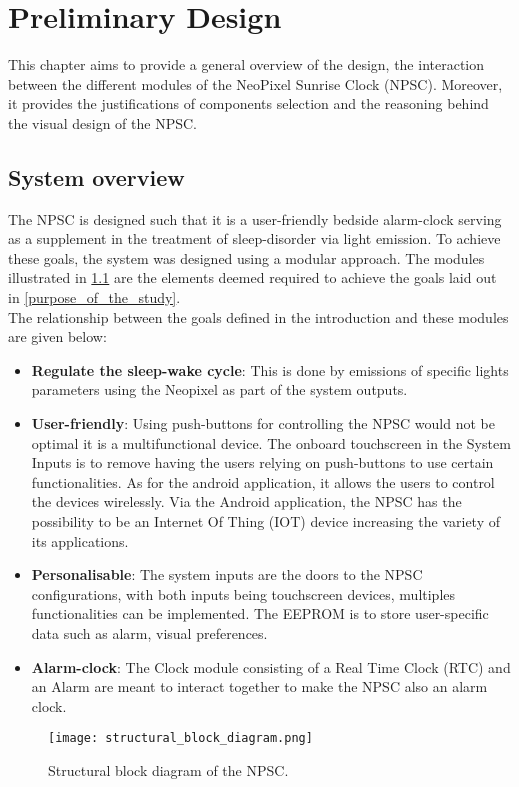 \chapter{Preliminary Design}

This chapter aims to provide a general overview of the design, the interaction between the different modules of the NeoPixel Sunrise Clock (NPSC). Moreover, it provides the justifications of components selection and the reasoning behind the visual design of the NPSC.

\section{System overview}\label{system_overview}
The NPSC is designed such that it is a user-friendly bedside alarm-clock serving as a supplement in the treatment of sleep-disorder via light emission. To achieve these goals, the system was designed using a modular approach. The modules illustrated in  \cref{fig:strutural_block_diagram} are the elements deemed required to achieve the goals laid out in \ref{purpose_of_the_study}. \\
The relationship between the goals defined in the introduction and these modules are given below:
\begin{itemize}
\item \textbf{Regulate the sleep-wake cycle}: This is done by emissions of specific lights parameters using the Neopixel as part of the system outputs.
\item \textbf{User-friendly}: Using push-buttons for controlling the NPSC would not be optimal it is a multifunctional device. The onboard touchscreen in the System Inputs is to remove having the users relying on push-buttons to use certain functionalities. As for the android application, it allows the users to control the devices wirelessly. Via the Android application, the NPSC has the possibility to be an Internet Of Thing (IOT) device increasing the variety of its applications.
\item \textbf{Personalisable}: The system inputs are the doors to the NPSC configurations, with both inputs being touchscreen devices, multiples functionalities can be implemented. The EEPROM is to store user-specific data such as alarm, visual preferences.
\item \textbf{Alarm-clock}: The Clock module consisting of a Real Time Clock (RTC) and an Alarm are meant to interact together to make the NPSC also an alarm clock.
\end{itemize}
\begin{figure}[ht]
\centering
\texttt{[image: structural\_block\_diagram.png]}
\caption{Structural block diagram of the NPSC.}
\label{fig:strutural_block_diagram}
\end{figure}


